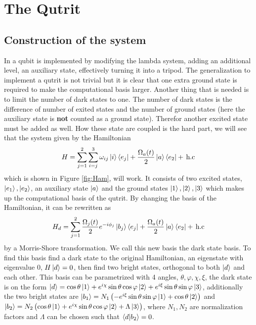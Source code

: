 \section{The Qutrit}
\subsection{Construction of the system}
In \cite{darkpath} a qubit is implemented by modifying the lambda system, adding an additional level, an auxiliary state, effectively turning it into a tripod. 
The generalization to implement a qutrit is not trivial but it is clear that one extra ground state is required to make the computational basis larger. Another thing that is needed is to limit the number of dark states to one. The number of dark states is the difference of number of exited states and the number of ground states\cite{lambda} (here the auxiliary state is \textbf{not} counted as a ground state). Therefor another excited state must be added as well. How these state are coupled is the hard part, we will see that the system given by the Hamiltonian
\begin{equation}
\label{eq:Ham}
H = \sum_{j = 1}^2 \sum_{i =j}^{3} \omega_{ij}\ket{i}\bra{e_j}  + \frac{\Omega_{a}(t)}{2}\ket{a}\bra{e_2}  +\,\text{h.c}
\end{equation}
which is shown in Figure \ref{fig:Ham}, will work.  It consists of two excited states, $\ket{e_1}, \ket{e_2}$, an auxiliary state $\ket{a}$ and the ground states $\ket{1}, \ket{2}, \ket{3}$ which 
makes up the computational basis of the qutrit. By changing the basis of the Hamiltonian, it can be rewritten as 
\begin{equation}
\label{eq:Hamd}
H_d = \sum_{j = 1}^2 \frac{\Omega_j(t)}{2}e^{-i\phi_j}\ket{b_j}\bra{e_j}  + \frac{\Omega_a(t)}{2}\ket{a}\bra{e_2}  +\,\text{h.c}
\end{equation} 
by a Morris-Shore transformation\cite{morris}. We call this new basis the dark state basis. To find this basis find a dark state to the original  Hamiltonian, an eigenstate with eigenvalue $0$, $H\ket{d} = 0$, then find two bright states, orthogonal to both $\ket{d}$ and each other. This basis can be parametrized with 4 angles, $\theta, \varphi, \chi, \xi$, the dark state is on the form $\ket{d} = \cos\theta\ket{1} + e^{i\chi}\sin\theta\cos\varphi\ket{2} + e^{i\xi}\sin\theta\sin\varphi\ket{3}$, additionally the two bright states are $\ket{b_1} = N_1 \left(-e^{i\xi}\sin\theta\sin\varphi\ket{1} + \cos\theta\ket{2} \right)$ and $\ket{b_2} = N_2 \left(\cos\theta\ket{1} +  e^{i\chi}\sin\theta\cos\varphi\ket{2} + \Lambda \ket{3}\right ) $, where $N_1, N_2$ are normalization factors and $\Lambda$ can be chosen such that $\bra{d}\ket{b_2} = 0$.

